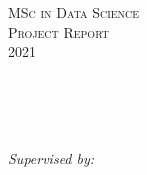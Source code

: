\documentclass[
11pt, %
oneside, %
english, %
onehalfspacing,
headsepline, %
consistentlayout, %
reqno, %
]{MastersDoctoralThesis} %
\author{Daniel Sikar} %
\begin{document}
\frontmatter %

\pagestyle{plain} %


\begin{titlepage}
\begin{center}

\vspace*{.06\textheight}
{\scshape\LARGE \univname\par}\vspace{1.5cm} %
\textsc{\Large MSc in Data Science}\\[0.5cm] %
\textsc{\Large Project Report}\\[0.5cm]
\textsc{\Large 2021}\\[0.5cm]

\HRule \\[0.4cm] %
{\huge \bfseries \ttitle\par}\vspace{0.4cm} %
\HRule \\[3.5cm] %
 
\begin{flushleft} \large
\authorname \\ [1cm]

\emph{Supervised by:} 
\supname \\ [3.5cm] %
\end{flushleft}
 

 


\end{center}
\end{titlepage}
\end{document}
